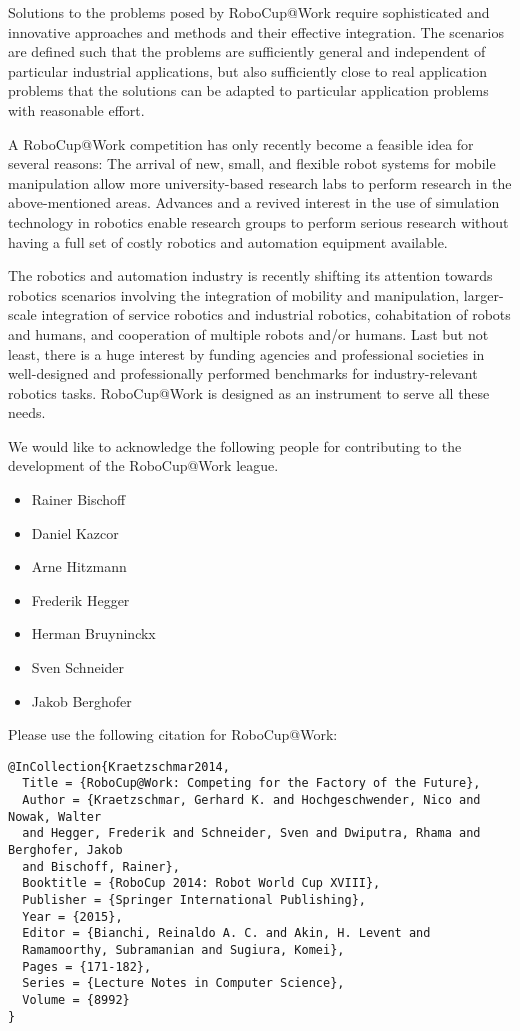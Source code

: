 Solutions to the problems posed by RoboCup@Work require sophisticated and innovative approaches and methods and their effective integration. The scenarios are defined such that the problems are sufficiently general and independent of particular industrial applications, but also sufficiently close to real application problems that the solutions can be adapted to particular application problems with reasonable effort.  
\par

A RoboCup@Work competition has only recently become a feasible idea for several reasons: The arrival of new, small, and flexible robot systems for mobile manipulation allow more university-based research labs to perform research in the above-mentioned areas. Advances and a revived interest in the use of simulation technology in robotics enable research groups to perform serious research without having a full set of costly robotics and automation equipment available. 
\par

The robotics and automation industry is recently shifting its attention towards robotics scenarios involving the integration of mobility and manipulation, larger-scale integration of service robotics and industrial robotics, cohabitation of robots and humans, and cooperation of multiple robots and/or humans. Last but not least, there is a huge interest by funding agencies and professional societies in well-designed and professionally performed benchmarks for industry-relevant robotics tasks. RoboCup@Work is designed as an instrument to serve all these needs.
\par 
We would like to acknowledge the following people for contributing to the development
of the RoboCup@Work league. 

\begin{itemize}
	\item Rainer Bischoff
	\item Daniel Kazcor
	\item Arne Hitzmann
	\item Frederik Hegger
	\item Herman Bruyninckx
	\item Sven Schneider
	\item Jakob Berghofer
\end{itemize} 

Please use the following citation for RoboCup@Work:
\begin{verbatim}
@InCollection{Kraetzschmar2014,
  Title = {RoboCup@Work: Competing for the Factory of the Future},
  Author = {Kraetzschmar, Gerhard K. and Hochgeschwender, Nico and Nowak, Walter 
  and Hegger, Frederik and Schneider, Sven and Dwiputra, Rhama and Berghofer, Jakob 
  and Bischoff, Rainer},
  Booktitle = {RoboCup 2014: Robot World Cup XVIII},
  Publisher = {Springer International Publishing},
  Year = {2015},
  Editor = {Bianchi, Reinaldo A. C. and Akin, H. Levent and 
  Ramamoorthy, Subramanian and Sugiura, Komei},
  Pages = {171-182},
  Series = {Lecture Notes in Computer Science},
  Volume = {8992}
}
\end{verbatim}